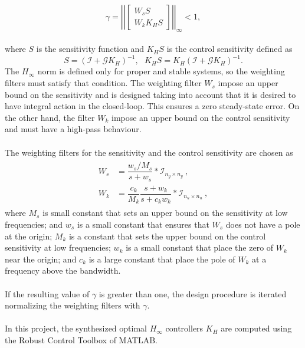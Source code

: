 	\begin{equation}\label{eqn:hinf}
	\gamma = \left|\left|\begin{bmatrix}
	W_{s}S\\W_{k}K_{H}S
	\end{bmatrix}\right|\right|_{\infty} < 1,
	\end{equation}
\\where $S$ is the sensitivity function and $K_{H}S$ is the control sensitivity defined as
	\begin{equation}
	S = (\mathcal{I} + \mathcal{G}K_{H})^{-1},\ \ \ K_{H}S = K_{H}(\mathcal{I} + \mathcal{G}K_{H})^{-1}.
	\end{equation}
The $H_\infty$ norm is defined only for proper and stable systems, so the weighting filters must satisfy that condition. The weighting filter $W_{s}$ impose an upper bound on the sensitivity and is designed taking into account that it is desired to have integral action in the closed-loop. This ensures a zero steady-state error. On the other hand, the filter $W_k$ impose an upper bound on the control sensitivity and must have a high-pass behaviour.
\\\\
The weighting filters for the sensitivity and the control sensitivity are chosen as
\begin{align}\label{eqn:wswk}
\begin{split}
W_{s} &= \dfrac{w_{s}/M_{s}}{s + w_{s}}*\mathcal{I}_{n_{y}\times n_{y}}\ ,\\
W_{k} &= \dfrac{c_k}{M_{k}}\dfrac{s+w_{k}}{s+c_{k}w_{k}}*\mathcal{I}_{n_{u}\times n_{u}}\ ,
\end{split}
\end{align}
where $M_s$ is small constant that sets an upper bound on the sensitivity at low frequencies; and $w_s$ is a small constant that ensures that $W_s$ does not have a pole at the origin; $M_k$ is a constant that sets the upper bound on the control sensitivity at low frequencies; $w_k$ is a small constant that place the zero of $W_k$ near the origin; and $c_k$ is a large constant that place the pole of $W_k$ at a frequency above the bandwidth.
\\\\
If the resulting value of $\gamma$ is greater than one, the design procedure is iterated normalizing the weighting filters with $\gamma$.
\\\\
In this project, the synthesized optimal $H_\infty$ controllers $K_H$ are computed using the Robust Control Toolbox of MATLAB.

